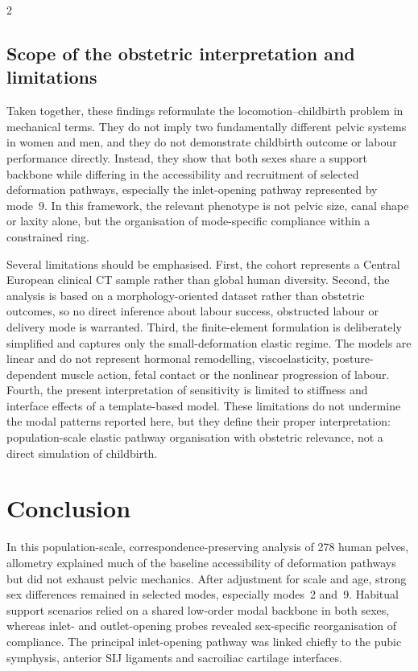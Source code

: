 \documentclass[openacc]{rsproca_new}
\begin{document}
\begin{multicols}{2}
\subsection{Scope of the obstetric interpretation and limitations}

Taken together, these findings reformulate the locomotion--childbirth problem in mechanical terms. They do not imply two fundamentally different pelvic systems in women and men, and they do not demonstrate childbirth outcome or labour performance directly. Instead, they show that both sexes share a support backbone while differing in the accessibility and recruitment of selected deformation pathways, especially the inlet-opening pathway represented by mode~9. In this framework, the relevant phenotype is not pelvic size, canal shape or laxity alone, but the organisation of mode-specific compliance within a constrained ring.

Several limitations should be emphasised. First, the cohort represents a Central European clinical CT sample rather than global human diversity. Second, the analysis is based on a morphology-oriented dataset rather than obstetric outcomes, so no direct inference about labour success, obstructed labour or delivery mode is warranted. Third, the finite-element formulation is deliberately simplified and captures only the small-deformation elastic regime. The models are linear and do not represent hormonal remodelling, viscoelasticity, posture-dependent muscle action, fetal contact or the nonlinear progression of labour. Fourth, the present interpretation of sensitivity is limited to stiffness and interface effects of a template-based model. These limitations do not undermine the modal patterns reported here, but they define their proper interpretation: population-scale elastic pathway organisation with obstetric relevance, not a direct simulation of childbirth.

\section{Conclusion}

In this population-scale, correspondence-preserving analysis of 278 human pelves, allometry explained much of the baseline accessibility of deformation pathways but did not exhaust pelvic mechanics. After adjustment for scale and age, strong sex differences remained in selected modes, especially modes~2 and~9. Habitual support scenarios relied on a shared low-order modal backbone in both sexes, whereas inlet- and outlet-opening probes revealed sex-specific reorganisation of compliance. The principal inlet-opening pathway was linked chiefly to the pubic symphysis, anterior SIJ ligaments and sacroiliac cartilage interfaces.


\end{multicols}
\end{document}
